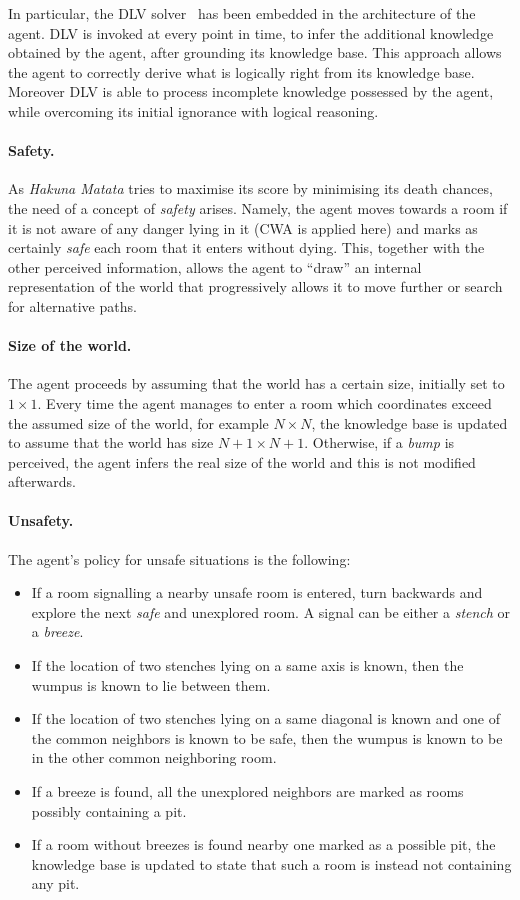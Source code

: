 \documentclass{llncs}
\newcommand{\hm}{\emph{Hakuna Matata}\xspace}
\begin{document}
In particular, the DLV solver~\cite{DLV-system} has been embedded in the architecture of the agent.
DLV is invoked at every point in time, to infer the additional knowledge obtained by the agent, after grounding its knowledge base.
This approach allows the agent to correctly derive what is logically right from its knowledge base. Moreover DLV is able to process incomplete knowledge possessed by the agent, while overcoming its initial ignorance with logical reasoning.

\paragraph{Safety.} As \hm tries to maximise its score by minimising its death chances, the need of a concept of \emph{safety} arises.
Namely, the agent moves towards a room if it is not aware of any danger lying in it (CWA is applied here) and marks as certainly \emph{safe} each room that it enters without dying.
This, together with the other perceived information, allows the agent to ``draw'' an internal representation of the world that progressively allows it to move further or search for alternative paths.

\paragraph{Size of the world.} The agent proceeds by assuming that the world has a certain size, initially set to $1 \times 1$.
Every time the agent manages to enter a room which coordinates exceed the assumed size of the world, for example $N \times N$, the knowledge base is updated to assume that the world has size $N+1 \times N+1$.
Otherwise, if a \emph{bump} is perceived, the agent infers the real size of the world and this is not modified afterwards.

\paragraph{Unsafety.} The agent's policy for unsafe situations is the following:
\begin{itemize}
	\item If a room signalling a nearby unsafe room is entered, turn backwards and explore the next \emph{safe} and unexplored room. A signal can be either a \emph{stench} or a \emph{breeze}.
	\item If the location of two stenches lying on a same axis is known, then the wumpus is known to lie between them.
	\item If the location of two stenches lying on a same diagonal is known and one of the common neighbors is known to be safe, then the wumpus is known to be in the other common neighboring room.
	\item If a breeze is found, all the unexplored neighbors are marked as rooms possibly containing a pit.
	\item If a room without breezes is found nearby one marked as a possible pit, the knowledge base is updated to state that such a room is instead not containing any pit.
\end{itemize}
\end{document}

